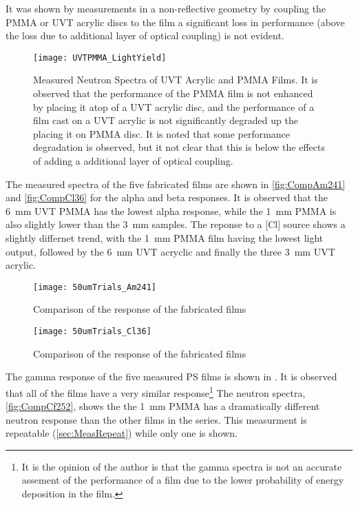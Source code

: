 \documentclass[draftcls,onecolumn]{IEEEtran}
\begin{document}
It was shown by measurements in a non-reflective geometry by coupling the PMMA or UVT acrylic discs to the film a significant loss in performance (above the loss due to additional layer of optical coupling) is not evident.
\begin{figure}
  \centering
  \texttt{[image: UVTPMMA\_LightYield]}
  \caption[Measured Effect of UVT acrylic and PMMA]{Measured Neutron Spectra of UVT Acrylic and PMMA Films. It is observed that the performance of the PMMA film is not enhanced by placing it atop of a UVT acrylic disc, and the performance of a film cast on a UVT acrylic is not significantly degraded up the placing it on PMMA disc. It is noted that some performance degradation is observed, but it not clear that this is below the effects of adding a additional layer of optical coupling.}
  \label{fig:RadMeasuredExper}
\end{figure}
The measured spectra of the five fabricated films are shown in \autoref{fig:CompAm241} and \autoref{fig:CompCl36} for the alpha and beta responses.
It is observed that the \SI{6}{\mm} UVT PMMA has the lowest alpha response, while the \SI{1}{\mm} PMMA is also slightly lower than the \SI{3}{\mm} samples.
The reponse to a [Cl] source shows a slightly differnet trend, with the \SI{1}{\mm} PMMA film having the lowest light output, followed by the \SI{6}{\mm} UVT acryclic and finally the three \SI{3}{\mm} UVT acrylic.
\begin{figure}[h]
  \centering
  \texttt{[image: 50umTrials\_Am241]}
  \caption[Fabricated Film Comparison (Alpha)]{Comparison of the  response of the fabricated films}
  \label{fig:CompAm241}
\end{figure}
\begin{figure}[h]
  \centering
  \texttt{[image: 50umTrials\_Cl36]}
  \caption[Fabricated Film Comparison (Beta)]{Comparison of the  response of the fabricated films}
  \label{fig:CompCl36}
\end{figure}
The gamma response of the five measured PS films is shown in .
It is observed that all of the films have a very similar response\footnote{It is the opinion of the author is that the gamma spectra is not an accurate assement of the performance of a film due to the lower probability of energy deposition in the film.}
The neutron spectra, \autoref{fig:CompCf252}, shows the the \SI{1}{\mm} PMMA has a dramatically different neutron response than the other films in the series.
This measurment is repeatable (\autoref{sec:MeasRepeat}) while only one is shown.
\end{document}
